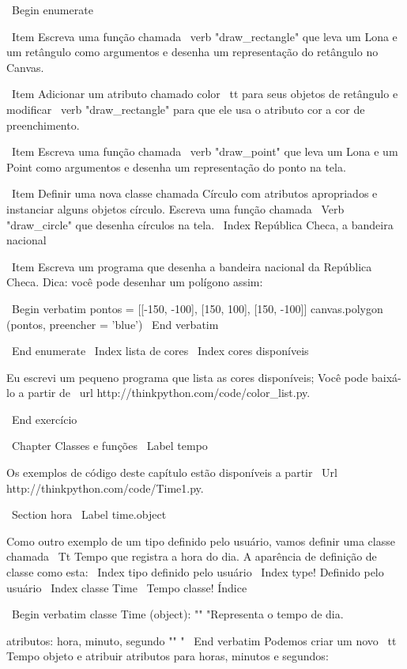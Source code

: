 \documentclass[10pt]{book}
\begin{document}
{{{{{{{{{{{{{\ Begin {enumerate}

\ Item Escreva uma função chamada \ verb "draw_rectangle" que leva um
  Lona e um retângulo como argumentos e desenha um
  representação do retângulo no Canvas.

\ Item Adicionar um atributo chamado {color \ tt} para seus objetos de retângulo e
  modificar \ verb "draw_rectangle" para que ele usa o atributo cor
  a cor de preenchimento.

\ Item Escreva uma função chamada \ verb "draw_point" que leva um
  Lona e um Point como argumentos e desenha um
  representação do ponto na tela.

\ Item Definir uma nova classe chamada Círculo com atributos apropriados e
  instanciar alguns objetos círculo. Escreva uma função chamada
  \ Verb "draw_circle" que desenha círculos na tela.
\ Index {República Checa, a bandeira nacional}

\ Item Escreva um programa que desenha a bandeira nacional da República Checa.
Dica: você pode desenhar um polígono assim:

\ Begin {verbatim}
pontos = [[-150, -100], [150, 100], [150, -100]]
canvas.polygon (pontos, preencher = 'blue')
\ End {verbatim}

\ End {enumerate}
\ Index {lista de cores}
\ Index {cores disponíveis}

Eu escrevi um pequeno programa que lista as cores disponíveis;
Você pode baixá-lo a partir de \ url {http://thinkpython.com/code/color_list.py}.

\ End {} exercício


\ Chapter {Classes e funções}
\ Label {tempo}

Os exemplos de código deste capítulo estão disponíveis a partir
\ Url {http://thinkpython.com/code/Time1.py}.

\ Section {hora}
\ Label {} time.object

Como outro exemplo de um tipo definido pelo usuário, vamos definir uma classe chamada
{\ Tt Tempo} que registra a hora do dia. A aparência de definição de classe
como esta:
\ Index {tipo definido pelo usuário}
\ Index {type! Definido pelo usuário}
\ Index {classe Time}
\ {Tempo classe!} Índice

\ Begin {verbatim}
classe Time (object):
    "" "Representa o tempo de dia.
       
    atributos: hora, minuto, segundo
    "" "
\ End {verbatim}
%
Podemos criar um novo {\ tt Tempo} objeto e atribuir
atributos para horas, minutos e segundos:

}}}}}}}}}}}}}
\end{document}
